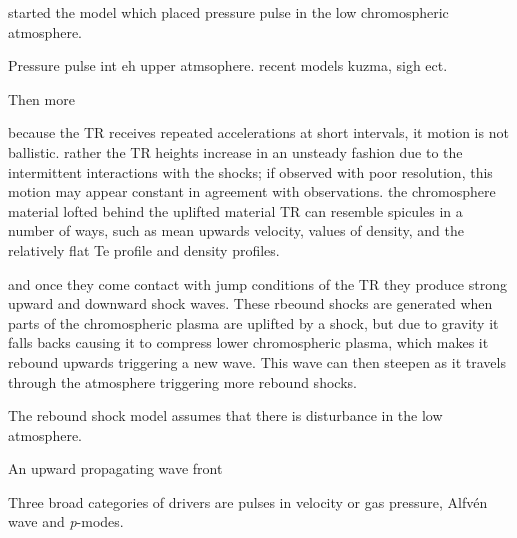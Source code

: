 \documentclass[12pt]{ociamthesis}
\newcommand{\Alfven}{Alfv\'{e}n }
\begin{document}
\cite{Suematsu1982SoPh7599S} started the model which placed pressure pulse in the low chromospheric atmosphere. 

Pressure pulse int eh upper atmsophere. recent models kuzma, sigh ect. 

Then more


because the TR receives repeated accelerations at short intervals, it motion is not ballistic. rather the TR heights increase in an unsteady fashion due to the intermittent interactions with the shocks; if observed with poor resolution, this motion may appear constant in agreement with observations. the chromosphere material lofted behind the uplifted material TR can resemble spicules in a number of ways, such as mean upwards velocity, values of density, and the relatively flat Te profile and density profiles.  


and once they come contact with jump conditions of the TR they produce strong upward and downward shock waves. These rbeound shocks are generated when parts of the chromospheric plasma are uplifted by a shock, but due to gravity it falls backs causing it to compress lower chromospheric plasma, which makes it rebound upwards triggering a new wave. This wave can then steepen as it travels through the atmosphere triggering more rebound shocks.

The rebound shock model assumes that there is disturbance in the low atmosphere. 

An upward propagating wave front 

      


Three broad categories of drivers are pulses in velocity or gas pressure, \Alfven wave and \textit{p}-modes.
\end{document}
